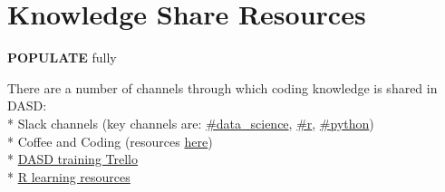 \documentclass[]{book}
\begin{document}
\hypertarget{ksresources}{%
\chapter{Knowledge Share Resources}\label{ksresources}}

\textbf{POPULATE} fully

There are a number of channels through which coding knowledge is shared in DASD:\\
* Slack channels (key channels are: \href{https://app.slack.com/client/T1PU1AP6D/C1Z8Q18LS}{\#data\_science}, \href{https://app.slack.com/client/T1PU1AP6D/C1PUCG719}{\#r}, \href{https://app.slack.com/client/T1PU1AP6D/C1Q09V86S}{\#python})\\
* Coffee and Coding (resources \href{https://github.com/moj-analytical-services/Coffee-and-Coding}{here})\\
* \href{https://trello.com/b/zAwm6sCc/dasd-training}{DASD training Trello}\\
* \href{https://docs.google.com/document/d/1R4hBMf26T9HEnCdVz56PpZhwiCv5RhberYL3BxOSKsA/edit}{R learning resources}
\end{document}
